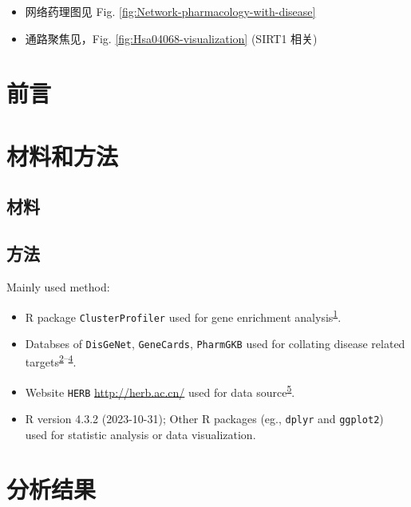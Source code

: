 \documentclass[
]{article}
\providecommand{\tightlist}{%
  \setlength{\itemsep}{0pt}\setlength{\parskip}{0pt}}
\begin{document}
\begin{itemize}
\tightlist
\item
  网络药理图见 Fig. \ref{fig:Network-pharmacology-with-disease}
\item
  通路聚焦见，Fig. \ref{fig:Hsa04068-visualization} (SIRT1 相关)
\end{itemize}

\hypertarget{introduction}{%
\section{前言}\label{introduction}}

\hypertarget{methods}{%
\section{材料和方法}\label{methods}}

\hypertarget{ux6750ux6599}{%
\subsection{材料}\label{ux6750ux6599}}

\hypertarget{ux65b9ux6cd5}{%
\subsection{方法}\label{ux65b9ux6cd5}}

Mainly used method:

\begin{itemize}
\tightlist
\item
  R package \texttt{ClusterProfiler} used for gene enrichment analysis\textsuperscript{\protect\hyperlink{ref-ClusterprofilerWuTi2021}{1}}.
\item
  Databses of \texttt{DisGeNet}, \texttt{GeneCards}, \texttt{PharmGKB} used for collating disease related targets\textsuperscript{\protect\hyperlink{ref-TheDisgenetKnPinero2019}{2}--\protect\hyperlink{ref-PharmgkbAWorBarbar2018}{4}}.
\item
  Website \texttt{HERB} \url{http://herb.ac.cn/} used for data source\textsuperscript{\protect\hyperlink{ref-HerbAHighThFang2021}{5}}.
\item
  R version 4.3.2 (2023-10-31); Other R packages (eg., \texttt{dplyr} and \texttt{ggplot2}) used for statistic analysis or data visualization.
\end{itemize}

\hypertarget{results}{%
\section{分析结果}\label{results}}
\end{document}

